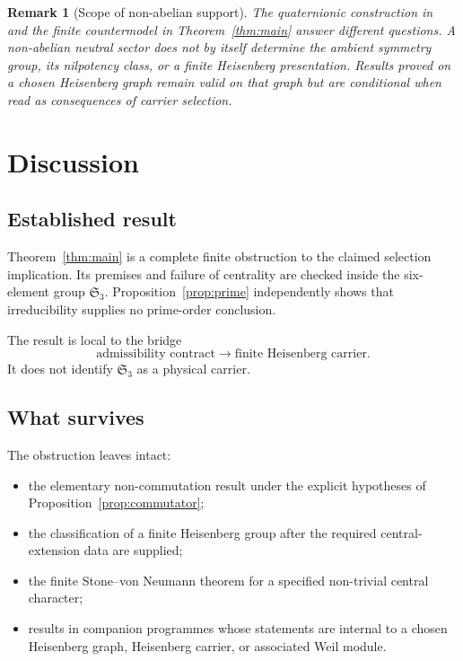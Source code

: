 \documentclass[11pt,a4paper]{article}
\newtheorem{remark}[theorem]{Remark}
\newcommand{\Sym}{\mathfrak{S}}
\begin{document}
    \begin{remark}[Scope of non-abelian support]
      \label{rem:nonabelian}
      The quaternionic construction in~\cite{O23} and the finite countermodel in
      Theorem~\ref{thm:main} answer different questions.
      A non-abelian neutral sector does not by itself determine the ambient
      symmetry group, its nilpotency class, or a finite Heisenberg presentation.
      Results proved on a chosen Heisenberg graph remain valid on that graph but
      are conditional when read as consequences of carrier selection.
    \end{remark}

  \clearpage
  \section{Discussion}
  \label{sec:discussion}

  \subsection{Established result}

    Theorem~\ref{thm:main} is a complete finite obstruction to the claimed
    selection implication.
    Its premises and failure of centrality are checked inside the six-element
    group $\Sym_3$.
    Proposition~\ref{prop:prime} independently shows that irreducibility supplies
    no prime-order conclusion.

    The result is local to the bridge
    \[
      \text{admissibility contract}
      \longrightarrow
      \text{finite Heisenberg carrier}.
    \]
    It does not identify $\Sym_3$ as a physical carrier.

  \subsection{What survives}

    The obstruction leaves intact:
    \begin{itemize}
      \item the elementary non-commutation result under the explicit hypotheses
      of Proposition~\ref{prop:commutator};
      \item the classification of a finite Heisenberg group after the required
      central-extension data are supplied;
      \item the finite Stone--von Neumann theorem for a specified non-trivial
      central character;
      \item results in companion programmes whose statements are internal to a
      chosen Heisenberg graph, Heisenberg carrier, or associated Weil module.
    \end{itemize}
\end{document}
